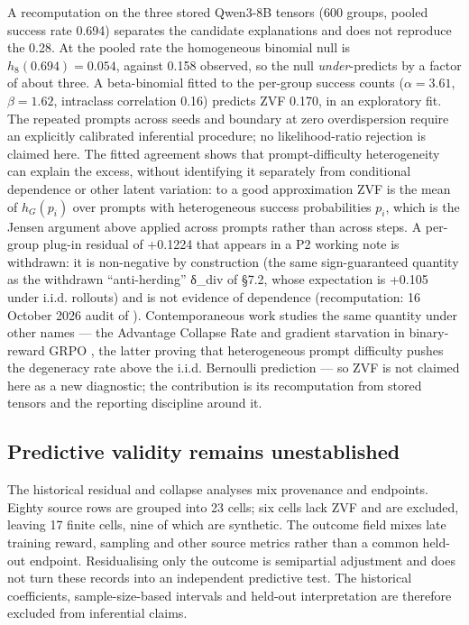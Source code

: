 \documentclass[12pt,a4paper]{report}
\DeclareRobustCommand{\longtok}[1]{\texttt{\seqsplit{#1}}}
\begin{document}
A recomputation on the three stored Qwen3-8B tensors (600 groups, pooled
success rate 0.694) separates the candidate explanations and does not
reproduce the 0.28. At the pooled rate the homogeneous binomial null is
\(h_8(0.694) = 0.054\), against 0.158 observed, so the null
\emph{under}-predicts by a factor of about three. A beta-binomial fitted
to the per-group success counts (\(\alpha = 3.61\), \(\beta = 1.62\),
intraclass correlation 0.16) predicts ZVF 0.170, in an exploratory fit.
The repeated prompts across seeds and boundary at zero overdispersion
require an explicitly calibrated inferential procedure; no
likelihood-ratio rejection is claimed here. The fitted agreement shows
that prompt-difficulty heterogeneity can explain the excess, without
identifying it separately from conditional dependence or other latent
variation: to a good approximation ZVF is the mean of \(h_G(p_i)\) over
prompts with heterogeneous success probabilities \(p_i\), which is the
Jensen argument above applied across prompts rather than across steps. A
per-group plug-in residual of +0.1224 that appears in a P2 working note
is withdrawn: it is non-negative by construction (the same
sign-guaranteed quantity as the withdrawn ``anti-herding'' δ\_div of
§7.2, whose expectation is +0.105 under i.i.d. rollouts) and is not
evidence of dependence (recomputation: 16 October 2026 audit of
\longtok{results/tinker\_\allowbreak{}gsm8k\_\allowbreak{}zvf\_\allowbreak{}s\{42,123,456\}.json}).
Contemporaneous work studies the same quantity under other names --- the
Advantage Collapse Rate \citep{he2026avspo} and gradient starvation in
binary-reward GRPO \citep{nie2026starvation}, the latter proving that
heterogeneous prompt difficulty pushes the degeneracy rate above the
i.i.d. Bernoulli prediction --- so ZVF is not claimed here as a new
diagnostic; the contribution is its recomputation from stored tensors
and the reporting discipline around it.

\subsection{Predictive validity remains
unestablished}\label{predictive-validity-remains-unestablished}

The historical residual and collapse analyses mix provenance and
endpoints. Eighty source rows are grouped into 23 cells; six cells lack
ZVF and are excluded, leaving 17 finite cells, nine of which are
synthetic. The outcome field mixes late training reward, sampling and
other source metrics rather than a common held-out endpoint.
Residualising only the outcome is semipartial adjustment and does not
turn these records into an independent predictive test. The historical
coefficients, sample-size-based intervals and held-out interpretation
are therefore excluded from inferential claims.
\end{document}
